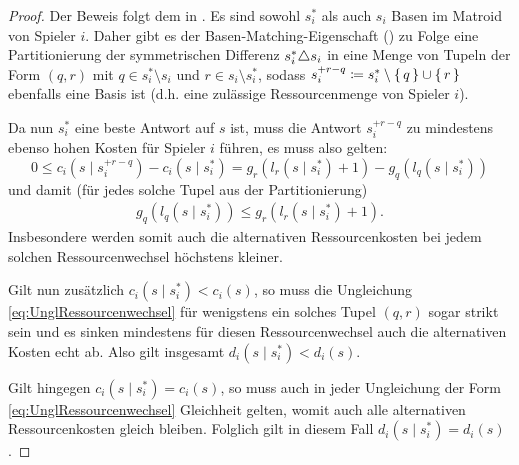 \begin{proof}
	Der Beweis folgt dem in \cite[Lemma 2.6]{BAPfadLaengeInAusl}. Es sind sowohl $s^\ast_i$ als auch $s_i$ Basen im Matroid von Spieler $i$. Daher gibt es der Basen-Matching-Eigenschaft () zu Folge eine Partitionierung der symmetrischen Differenz $s^\ast_i \triangle s_i$ in eine Menge von Tupeln der Form $(q,r)$ mit $q \in s^\ast_i\setminus s_i$ und $r \in s_i \setminus s^\ast_i$, sodass $s_i^{+r-q} \coloneqq s^\ast_i\setminus\set{q}\cup\set{r}$ ebenfalls eine Basis ist (d.h. eine zulässige Ressourcenmenge von Spieler $i$).
	
	Da nun $s^\ast_i$ eine beste Antwort auf $s$ ist, muss die Antwort $s_i^{+r-q}$ zu mindestens ebenso hohen Kosten für Spieler $i$ führen, es muss also gelten:
		\[0 \leq c_i(s \mid s_i^{+r-q}) - c_i(s \mid s^\ast_i) = g_r(l_r(s \mid s^\ast_i)+1) - g_q(l_q(s \mid s^\ast_i))\]
	und damit (für jedes solche Tupel aus der Partitionierung)
	\begin{align}\label{eq:UnglRessourcenwechsel}
		g_q(l_q(s \mid s^\ast_i)) \leq g_r(l_r(s \mid s^\ast_i)+1).
	\end{align}
	Insbesondere werden somit auch die alternativen Ressourcenkosten bei jedem solchen Ressourcenwechsel höchstens kleiner.
	
	Gilt nun zusätzlich $c_i(s \mid s^\ast_i) < c_i(s)$, so muss die Ungleichung \eqref{eq:UnglRessourcenwechsel} für wenigstens ein solches Tupel $(q,r)$ sogar strikt sein und es sinken mindestens für diesen Ressourcenwechsel auch die alternativen Kosten echt ab. Also gilt insgesamt $d_i(s \mid s^\ast_i) < d_i(s)$.
	
	Gilt hingegen $c_i(s \mid s^\ast_i) = c_i(s)$, so muss auch in jeder Ungleichung der Form \eqref{eq:UnglRessourcenwechsel} Gleichheit gelten, womit auch alle alternativen Ressourcenkosten gleich bleiben. Folglich gilt in diesem Fall $d_i(s \mid s^\ast_i) = d_i(s)$.
\end{proof}

